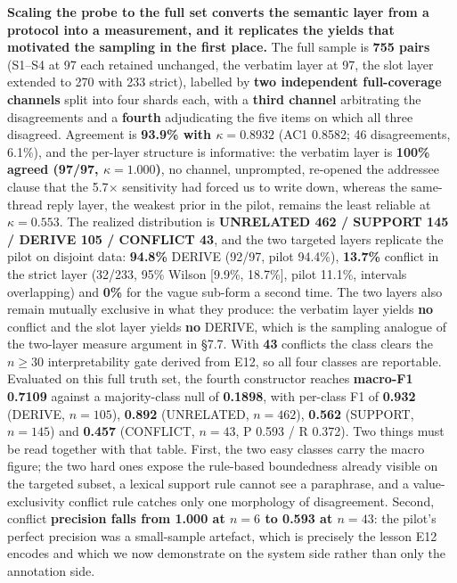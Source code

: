 \textbf{Scaling the probe to the full set converts the semantic layer from a protocol into a measurement, and it replicates the yields that motivated the sampling in the first place.} The full sample is \textbf{755 pairs} (S1--S4 at 97 each retained unchanged, the verbatim layer at 97, the slot layer extended to 270 with 233 strict), labelled by \textbf{two independent full-coverage channels} split into four shards each, with a \textbf{third channel} arbitrating the disagreements and a \textbf{fourth} adjudicating the five items on which all three disagreed. Agreement is \textbf{93.9\% with $\kappa=0.8932$} (AC1 0.8582; 46 disagreements, 6.1\%), and the per-layer structure is informative: the verbatim layer is \textbf{100\% agreed (97/97, $\kappa=1.000$)}, no channel, unprompted, re-opened the addressee clause that the 5.7$\times$ sensitivity had forced us to write down, whereas the same-thread reply layer, the weakest prior in the pilot, remains the least reliable at $\kappa=0.553$. The realized distribution is \textbf{UNRELATED 462 / SUPPORT 145 / DERIVE 105 / CONFLICT 43}, and the two targeted layers replicate the pilot on disjoint data: \textbf{94.8\%} DERIVE (92/97, pilot 94.4\%), \textbf{13.7\%} conflict in the strict layer (32/233, 95\% Wilson [9.9\%, 18.7\%], pilot 11.1\%, intervals overlapping) and \textbf{0\%} for the vague sub-form a second time. The two layers also remain mutually exclusive in what they produce: the verbatim layer yields \textbf{no} conflict and the slot layer yields \textbf{no} DERIVE, which is the sampling analogue of the two-layer measure argument in \S7.7. With \textbf{43} conflicts the class clears the $n\ge 30$ interpretability gate derived from E12, so all four classes are reportable. Evaluated on this full truth set, the fourth constructor reaches \textbf{macro-F1 0.7109} against a majority-class null of \textbf{0.1898}, with per-class F1 of \textbf{0.932} (DERIVE, $n{=}105$), \textbf{0.892} (UNRELATED, $n{=}462$), \textbf{0.562} (SUPPORT, $n{=}145$) and \textbf{0.457} (CONFLICT, $n{=}43$, P 0.593 / R 0.372). Two things must be read together with that table. First, the two easy classes carry the macro figure; the two hard ones expose the rule-based boundedness already visible on the targeted subset, a lexical support rule cannot see a paraphrase, and a value-exclusivity conflict rule catches only one morphology of disagreement. Second, conflict \textbf{precision falls from 1.000 at $n{=}6$ to 0.593 at $n{=}43$}: the pilot's perfect precision was a small-sample artefact, which is precisely the lesson E12 encodes and which we now demonstrate on the system side rather than only the annotation side.
